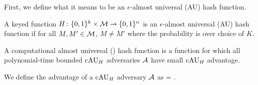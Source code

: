 First, we define what it means to be an $\epsilon$-almost universal (AU) hash function.

A keyed function $H{{\kern .05em}\colon{\kern .05em}}\{0,1\}^k\times{\cal M}\rightarrow\{0,1\}^n$ is
an $\epsilon$-almost universal (AU) hash function  if for all $M,M'\in{\cal M}$, $M \ne M'$
\bnm
   \le \epsilon
\enm
where the probability is over choice of $K$.

A computational almost universal (\cAU) hash function is a function for which all polynomial-time bounded $\textnormal{cAU}_H$ adversaries ${\mathcal A}$ have small $\textnormal{cAU}_H$ advantage.
\begin{figure}[h]
\centering
{}
\end{figure}

We define the advantage of a $\textnormal{cAU}_H$ adversary ${\mathcal A}$ as
\bnm
   = \;.
\enm
{}

